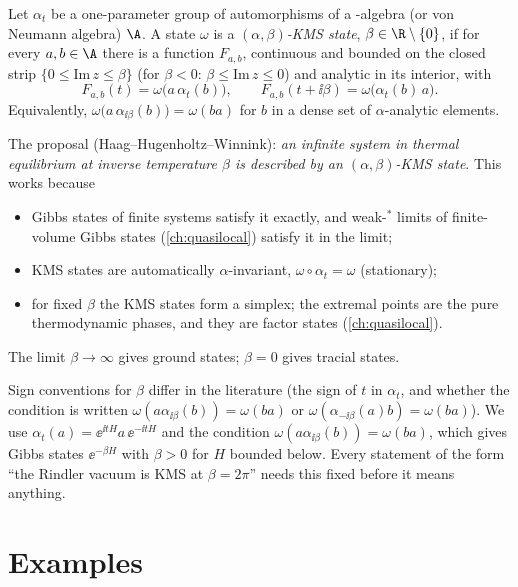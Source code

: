 \begin{definition}
Let $\alpha_t$ be a one-parameter group of automorphisms of a \cstar-algebra (or von Neumann algebra) $\A$. A state $\omega$ is a \emph{$(\alpha,\beta)$-KMS state}, $\beta\in\R\setminus\{0\}$, if for every $a,b\in\A$ there is a function $F_{a,b}$, continuous and bounded on the closed strip $\{0\le\mathrm{Im}\,z\le\beta\}$ (for $\beta<0$: $\beta\le\mathrm{Im}\,z\le0$) and analytic in its interior, with
\begin{equation}
F_{a,b}(t)=\omega\big(a\,\alpha_t(b)\big),\qquad F_{a,b}(t+\ii\beta)=\omega\big(\alpha_t(b)\,a\big).
\end{equation}
Equivalently, $\omega\big(a\,\alpha_{\ii\beta}(b)\big)=\omega(ba)$ for $b$ in a dense set of $\alpha$-analytic elements.
\end{definition}

The proposal (Haag--Hugenholtz--Winnink): \emph{an infinite system in thermal equilibrium at inverse temperature $\beta$ is described by an $(\alpha,\beta)$-KMS state}. This works because
\begin{itemize}
\item Gibbs states of finite systems satisfy it exactly, and weak-$^*$ limits of finite-volume Gibbs states (\cref{ch:quasilocal}) satisfy it in the limit;
\item KMS states are automatically $\alpha$-invariant, $\omega\circ\alpha_t=\omega$ (stationary);
\item for fixed $\beta$ the KMS states form a simplex; the extremal points are the pure thermodynamic phases, and they are factor states (\cref{ch:quasilocal}).
\end{itemize}
The limit $\beta\to\infty$ gives ground states; $\beta=0$ gives tracial states.

\begin{whatwrong}
Sign conventions for $\beta$ differ in the literature (the sign of $t$ in $\alpha_t$, and whether the condition is written $\omega(a\alpha_{\ii\beta}(b))=\omega(ba)$ or $\omega(\alpha_{-\ii\beta}(a)b)=\omega(ba)$). We use $\alpha_t(a)=\ee^{\ii tH}a\,\ee^{-\ii tH}$ and the condition $\omega(a\alpha_{\ii\beta}(b))=\omega(ba)$, which gives Gibbs states $\ee^{-\beta H}$ with $\beta>0$ for $H$ bounded below. Every statement of the form ``the Rindler vacuum is KMS at $\beta=2\pi$'' needs this fixed before it means anything.
\end{whatwrong}

\section{Examples}


